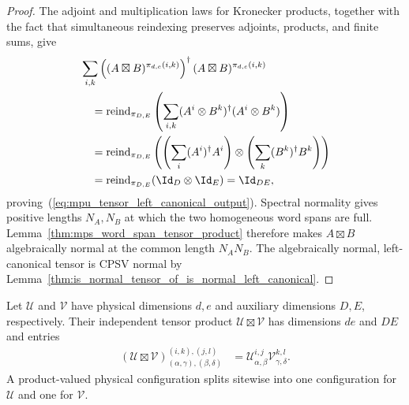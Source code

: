 \begin{proof}\leanok
    The adjoint and multiplication laws for Kronecker products, together
    with the fact that simultaneous reindexing preserves adjoints, products,
    and finite sums, give
    \begin{align}
         & \sum_{i,k}
        \left((A\boxtimes B)^{\pi_{d,e}(i,k)}\right)^\dagger
        (A\boxtimes B)^{\pi_{d,e}(i,k)}                 \\
         & \quad=\operatorname{reind}_{\pi_{D,E}}
        \left(\sum_{i,k}
        (A^i\otimes B^k)^\dagger(A^i\otimes B^k)\right) \\
         & \quad=\operatorname{reind}_{\pi_{D,E}}
        \left(
        \left(\sum_i(A^i)^\dagger A^i\right)\otimes
        \left(\sum_k(B^k)^\dagger B^k\right)
        \right)                                         \\
         & \quad=\operatorname{reind}_{\pi_{D,E}}
        (\Id_D\otimes\Id_E)=\Id_{DE},
    \end{align}
    proving~(\ref{eq:mpu_tensor_left_canonical_output}).  Spectral normality
    gives positive lengths $N_A,N_B$ at which the two homogeneous word spans
    are full.  Lemma~\ref{thm:mps_word_span_tensor_product} therefore makes
    $A\boxtimes B$ algebraically normal at the common length $N_A N_B$.
    The algebraically normal, left-canonical tensor is CPSV normal by
    Lemma~\ref{thm:is_normal_tensor_of_is_normal_left_canonical}.
\end{proof}

\begin{definition}
    \label{def:mpu_independent_tensor_product}
    \leanok
    Let $\mathcal U$ and $\mathcal V$ have physical dimensions $d,e$ and
    auxiliary dimensions $D,E$, respectively. Their independent tensor
    product $\mathcal U\boxtimes\mathcal V$ has dimensions $de$ and $DE$ and
    entries
    \begin{align}
        (\mathcal U\boxtimes\mathcal V)^{(i,k),(j,l)}_{(\alpha,\gamma),(\beta,\delta)}
         & =\mathcal U^{i,j}_{\alpha,\beta}\mathcal V^{k,l}_{\gamma,\delta}.
    \end{align}
    A product-valued physical configuration splits sitewise into one
    configuration for $\mathcal U$ and one for $\mathcal V$.
\end{definition}

